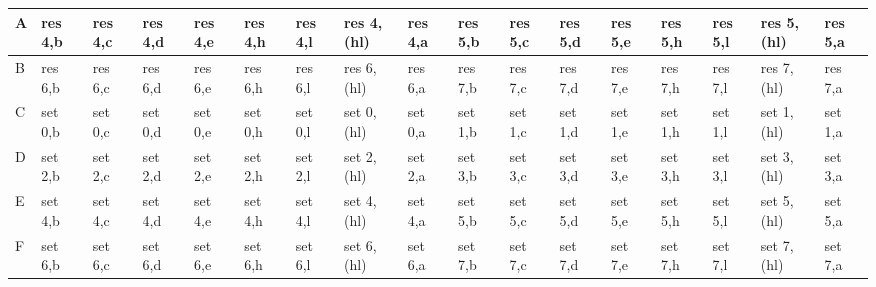 \begin{ttfamily}
\begin{tiny}
\begin{tabularx}{1\textwidth}{l|X|X|X|X|X|X|X|X|X|X|X|X|X|X|X|X}
A & res 4,b & res 4,c & res 4,d & res 4,e & res 4,h & res 4,l & res 4,(hl) & res 4,a & res 5,b & res 5,c & res 5,d & res 5,e & res 5,h & res 5,l & res 5,(hl) & res 5,a \\ \hline
B & res 6,b & res 6,c & res 6,d & res 6,e & res 6,h & res 6,l & res 6,(hl) & res 6,a & res 7,b & res 7,c & res 7,d & res 7,e & res 7,h & res 7,l & res 7,(hl) & res 7,a \\ \hline
C & set 0,b & set 0,c & set 0,d & set 0,e & set 0,h & set 0,l & set 0,(hl) & set 0,a & set 1,b & set 1,c & set 1,d & set 1,e & set 1,h & set 1,l & set 1,(hl) & set 1,a \\ \hline
D & set 2,b & set 2,c & set 2,d & set 2,e & set 2,h & set 2,l & set 2,(hl) & set 2,a & set 3,b & set 3,c & set 3,d & set 3,e & set 3,h & set 3,l & set 3,(hl) & set 3,a \\ \hline
E & set 4,b & set 4,c & set 4,d & set 4,e & set 4,h & set 4,l & set 4,(hl) & set 4,a & set 5,b & set 5,c & set 5,d & set 5,e & set 5,h & set 5,l & set 5,(hl) & set 5,a \\ \hline
F & set 6,b & set 6,c & set 6,d & set 6,e & set 6,h & set 6,l & set 6,(hl) & set 6,a & set 7,b & set 7,c & set 7,d & set 7,e & set 7,h & set 7,l & set 7,(hl) & set 7,a \\ \hline
\end{tabularx}
\end{tiny}
\end{ttfamily}


